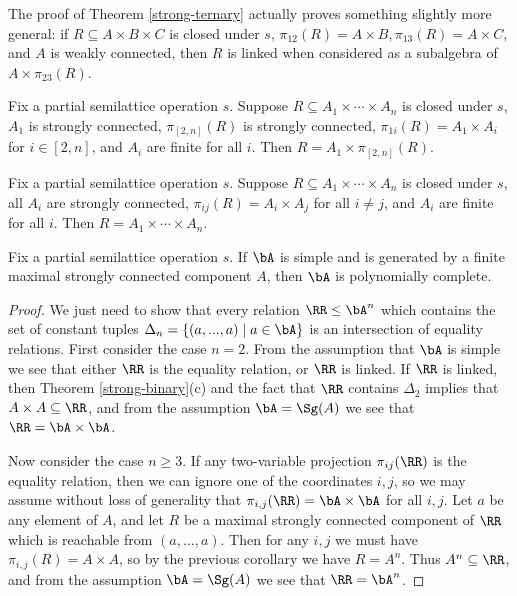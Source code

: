 \begin{rem} The proof of Theorem \ref{strong-ternary} actually proves something slightly more general: if $R \subseteq A\times B \times C$ is closed under $s$, $\pi_{12}(R) = A\times B, \pi_{13}(R) = A\times C$, and $A$ is weakly connected, then $R$ is linked when considered as a subalgebra of $A \times \pi_{23}(R)$.
\end{rem}

\begin{cor} Fix a partial semilattice operation $s$. Suppose $R \subseteq A_1 \times \cdots \times A_n$ is closed under $s$, $A_1$ is strongly connected, $\pi_{[2,n]}(R)$ is strongly connected, $\pi_{1i}(R) = A_1 \times A_i$ for $i \in [2,n]$, and $A_i$ are finite for all $i$. Then $R = A_1 \times \pi_{[2,n]}(R)$.
\end{cor}

\begin{cor}\label{strong-product} Fix a partial semilattice operation $s$. Suppose $R \subseteq A_1 \times \cdots \times A_n$ is closed under $s$, all $A_i$ are strongly connected, $\pi_{ij}(R) = A_i \times A_j$ for all $i \ne j$, and $A_i$ are finite for all $i$. Then $R = A_1 \times \cdots \times A_n$.
\end{cor}

\begin{cor}\label{simple-strong-poly} Fix a partial semilattice operation $s$. If $\bA$ is simple and is generated by a finite maximal strongly connected component $A$, then $\bA$ is polynomially complete.
\end{cor}
\begin{proof} We just need to show that every relation $\RR \le \bA^n$ which contains the set of constant tuples $\Delta_n = \{(a, ..., a) \mid a \in \bA\}$ is an intersection of equality relations. First consider the case $n = 2$. From the assumption that $\bA$ is simple we see that either $\RR$ is the equality relation, or $\RR$ is linked. If $\RR$ is linked, then Theorem \ref{strong-binary}(c) and the fact that $\RR$ contains $\Delta_2$ implies that $A \times A \subseteq \RR$, and from the assumption $\bA = \Sg(A)$ we see that $\RR = \bA \times \bA$.

Now consider the case $n \ge 3$. If any two-variable projection $\pi_{ij}(\RR)$ is the equality relation, then we can ignore one of the coordinates $i,j$, so we may assume without loss of generality that $\pi_{i,j}(\RR) = \bA\times \bA$ for all $i,j$. Let $a$ be any element of $A$, and let $R$ be a maximal strongly connected component of $\RR$ which is reachable from $(a, ..., a)$. Then for any $i,j$ we must have $\pi_{i,j}(R) = A\times A$, so by the previous corollary we have $R = A^n$. Thus $A^n \subseteq \RR$, and from the assumption $\bA = \Sg(A)$ we see that $\RR = \bA^n$.
\end{proof}

